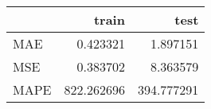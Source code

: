 \begin{tabular}{lrr}
\toprule
{} &       train &        test \\
\midrule
MAE  &    0.423321 &    1.897151 \\
MSE  &    0.383702 &    8.363579 \\
MAPE &  822.262696 &  394.777291 \\
\bottomrule
\end{tabular}
